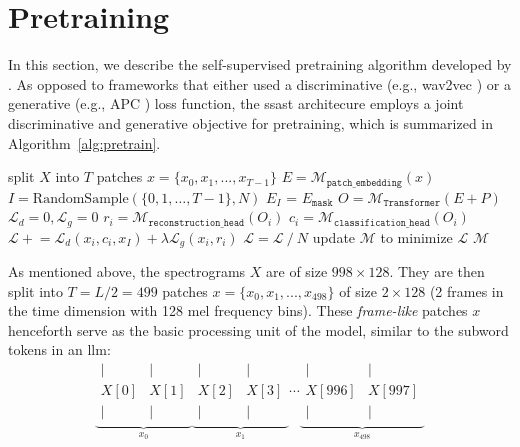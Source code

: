 \section{Pretraining}
\label{methods_pretraining}

In this section, we describe the self-supervised pretraining algorithm developed by \cite{gong2022ssast}. As opposed to frameworks that either used a discriminative (e.g., wav2vec \cite{schneider2019wav2vec}) or a generative (e.g., APC \cite{chung2020generative}) loss function, the \gls{ssast} architecure employs a joint discriminative and generative objective for pretraining, which is summarized in Algorithm~\ref{alg:pretrain}.

\begin{algorithm}[h]
\caption{Joint Discriminative and Generative Masked Spectrogram Patch Modeling}
\label{alg:pretrain}
\begin{algorithmic}[1]
        \State split $X$ into $T$ patches $x=\{x_0, x_1, ..., x_{T-1}\}$
        \State $E=\mathcal{M}_{\texttt{patch\_embedding}}(x)$ 
        \State $I=\text{RandomSample}(\{0, 1, \dots, T-1\}, N)$ 
        \State $E_I$ = $E_{\texttt{mask}}$ 
        \State $O=\mathcal{M}_{\texttt{Transformer}}(E+P)$
        \State $\mathcal{L}_d=0,\mathcal{L}_g=0$
            \State $r_i=\mathcal{M}_{\texttt{reconstruction\_head}}(O_i)$
            \State $c_i=\mathcal{M}_{\texttt{classification\_head}}(O_i)$
            \State $\mathcal{L} \mathrel{+}= \mathcal{L}_d(x_i,c_i,x_I) + \lambda\mathcal{L}_g(x_i,r_i)$
        \EndFor
        \State$\mathcal{L} = \mathcal{L}\mathbin{/}N$
        \State update $\mathcal{M}$ to minimize $\mathcal{L}$ 
    \EndFor
\EndFor 
\Return $\mathcal{M}$
\end{algorithmic}
\end{algorithm}

As mentioned above, the spectrograms $X$ are of size $998\times128$. They are then split into $T=L/2=499$ patches $x=\{x_0, x_1, ..., x_{498}\}$ of size $2 \times 128$ (2 frames in the time dimension with 128 mel frequency bins). These \textit{frame-like} patches $x$ henceforth serve as the basic processing unit of the model, similar to the subword tokens in an \gls{llm}:
\[
\underbrace{\begin{array}{cc}
\vert & \vert \\
X[0] & X[1] \\
\vert & \vert
\end{array}}_{x_0}
\underbrace{\begin{array}{cc}
\vert & \vert \\
X[2] & X[3] \\
\vert & \vert
\end{array}}_{x_1}
\cdots
\underbrace{\begin{array}{cc}
\vert & \vert \\
X[996] & X[997] \\
\vert & \vert
\end{array}}_{x_{498}}
\]

